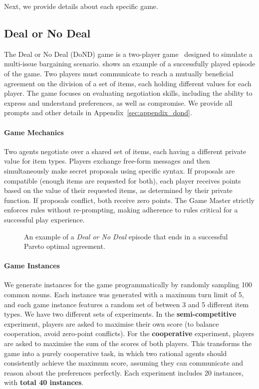 \documentclass[11pt]{article}
\begin{document}
Next, we provide details about each specific game.

\subsection{Deal or No Deal}

The Deal or No Deal (DoND) game is a two-player game~\cite{lewis-etal-2017-deal} designed to simulate a multi-issue bargaining scenario.  shows an example of a successfully played episode of the game. Two players must communicate to reach a mutually beneficial agreement on the division of a set of items, each holding different values for each player. The game focuses on evaluating negotiation skills, including the ability to express and understand preferences, as well as compromise. We provide all prompts and other details in Appendix~\ref{sec:appendix_dond}.



\paragraph{Game Mechanics}
Two agents negotiate over a shared set of items, each having a different private value for item types. Players exchange free-form messages and then simultaneously make secret proposals using specific syntax. If proposals are compatible (enough items are requested for both), each player receives points based on the value of their requested items, as determined by their private function. If proposals conflict, both receive zero points. The Game Master strictly enforces rules without re-prompting, making adherence to rules critical for a successful play experience.

\begin{figure}[ht!]
  \centering
  
  \caption{An example of a \textit{Deal or No Deal} episode that ends in a successful Pareto optimal agreement.}
  \label{fig:dond_example}
  \vspace*{-.6cm}
\end{figure}

\paragraph{Game Instances}
We generate instances for the game programmatically by randomly sampling 100 common nouns. Each instance was generated with a maximum turn limit of 5, and each game instance features a random set of between 3 and 5 different item types. We have two different sets of experiments. In the \textbf{semi-competitive} experiment, players are asked to maximise their own score (to balance cooperation, avoid zero-point conflicts). For the \textbf{cooperative} experiment, players are asked to maximise the sum of the scores of both players. This transforms the game into a purely cooperative task, in which two rational agents should consistently achieve the maximum score, assuming they can communicate and reason about the preferences perfectly. Each experiment includes 20 instances, with \textbf{total 40 instances}.
\end{document}
